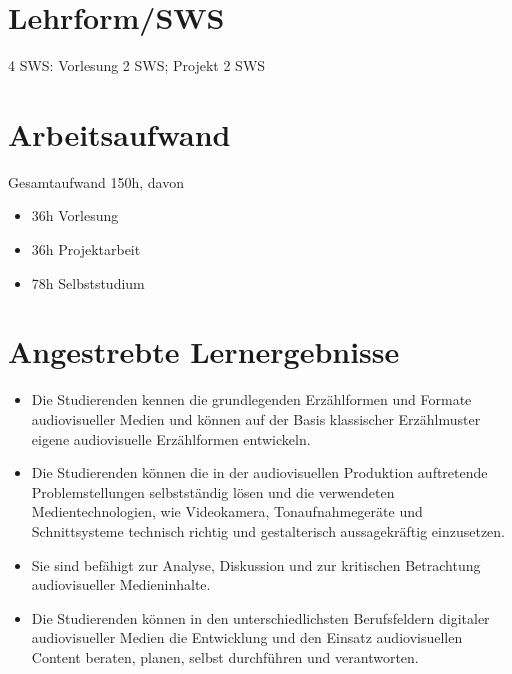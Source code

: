 \section*{Lehrform/SWS\label{/mi-2017/modulbeschreibungen-bachelor/BA_AVM}}\label{lehrformswspathlabelmi-2017modulbeschreibungen-bachelorbaux5favm}

4 SWS: Vorlesung 2 SWS; Projekt 2 SWS

\section*{Arbeitsaufwand\label{/mi-2017/modulbeschreibungen-bachelor/BA_AVM}}\label{arbeitsaufwandpathlabelmi-2017modulbeschreibungen-bachelorbaux5favm}

Gesamtaufwand 150h, davon

\begin{itemize}
\tightlist
\item
  36h Vorlesung
\item
  36h Projektarbeit
\item
  78h Selbststudium
\end{itemize}

\section*{Angestrebte
Lernergebnisse\label{/mi-2017/modulbeschreibungen-bachelor/BA_AVM}}\label{angestrebte-lernergebnissepathlabelmi-2017modulbeschreibungen-bachelorbaux5favm}

\begin{itemize}
\tightlist
\item
  Die Studierenden kennen die grundlegenden Erzählformen und Formate
  audiovisueller Medien und können auf der Basis klassischer
  Erzählmuster eigene audiovisuelle Erzählformen entwickeln.
\item
  Die Studierenden können die in der audiovisuellen Produktion
  auftretende Problemstellungen selbstständig lösen und die verwendeten
  Medientechnologien, wie Videokamera, Tonaufnahmegeräte und
  Schnittsysteme technisch richtig und gestalterisch aussagekräftig
  einzusetzen.
\item
  Sie sind befähigt zur Analyse, Diskussion und zur kritischen
  Betrachtung audiovisueller Medieninhalte.
\item
  Die Studierenden können in den unterschiedlichsten Berufsfeldern
  digitaler audiovisueller Medien die Entwicklung und den Einsatz
  audiovisuellen Content beraten, planen, selbst durchführen und
  verantworten.
\end{itemize}

